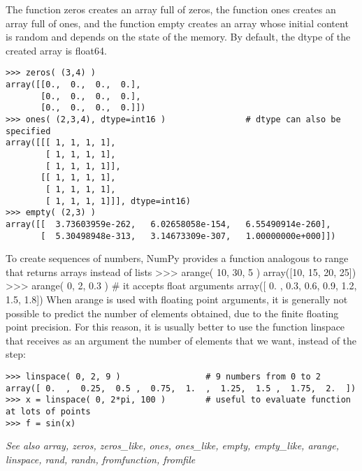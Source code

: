The function zeros creates an array full of zeros, the function ones creates an array full of ones, and the function empty creates an array whose initial content is random and depends on the state of the memory. By default, the dtype of the created array is float64.
\begin{verbatim}
>>> zeros( (3,4) )
array([[0.,  0.,  0.,  0.],
       [0.,  0.,  0.,  0.],
       [0.,  0.,  0.,  0.]])
>>> ones( (2,3,4), dtype=int16 )                # dtype can also be specified
array([[[ 1, 1, 1, 1],
        [ 1, 1, 1, 1],
        [ 1, 1, 1, 1]],
       [[ 1, 1, 1, 1],
        [ 1, 1, 1, 1],
        [ 1, 1, 1, 1]]], dtype=int16)
>>> empty( (2,3) )
array([[  3.73603959e-262,   6.02658058e-154,   6.55490914e-260],
       [  5.30498948e-313,   3.14673309e-307,   1.00000000e+000]])
\end{verbatim}
To create sequences of numbers, NumPy provides a function analogous to range that returns arrays instead of lists
>>> arange( 10, 30, 5 )
array([10, 15, 20, 25])
>>> arange( 0, 2, 0.3 )                 # it accepts float arguments
array([ 0. ,  0.3,  0.6,  0.9,  1.2,  1.5,  1.8])
When arange is used with floating point arguments, it is generally not possible to predict the number of elements obtained, due to the finite floating point precision. For this reason, it is usually better to use the function linspace that receives as an argument the number of elements that we want, instead of the step:

\begin{verbatim}
>>> linspace( 0, 2, 9 )                 # 9 numbers from 0 to 2
array([ 0.  ,  0.25,  0.5 ,  0.75,  1.  ,  1.25,  1.5 ,  1.75,  2.  ])
>>> x = linspace( 0, 2*pi, 100 )        # useful to evaluate function at lots of points
>>> f = sin(x)
\end{verbatim}
\textit{See also
array, zeros, zeros_like, ones, ones_like, empty, empty_like, arange, linspace, rand, randn, fromfunction, fromfile}
\newpage

